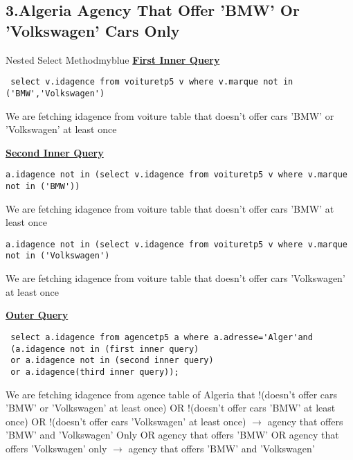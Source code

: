 \subsection*{3.Algeria Agency That Offer 'BMW' Or 'Volkswagen' Cars Only}


\begin{prettyBox}{Nested Select Method}{myblue}
\textbf{\underline{First Inner Query}}

\begin{lstlisting}
 select v.idagence from voituretp5 v where v.marque not in ('BMW','Volkswagen')
\end{lstlisting}
We are fetching idagence from voiture table that doesn't offer cars 'BMW' or 'Volkswagen' at least once
\vspace{0.25cm}

\textbf{\underline{Second Inner Query}}
\begin{lstlisting}
a.idagence not in (select v.idagence from voituretp5 v where v.marque not in ('BMW'))
\end{lstlisting}
We are fetching idagence from voiture table that doesn't offer cars 'BMW' at least once
\vspace{0.25cm}

\begin{lstlisting}
a.idagence not in (select v.idagence from voituretp5 v where v.marque not in ('Volkswagen')
\end{lstlisting}
We are fetching idagence from voiture table that doesn't offer cars 'Volkswagen' at least once
\vspace{0.25cm}

\textbf{\underline{Outer Query}}
\begin{lstlisting}
 select a.idagence from agencetp5 a where a.adresse='Alger'and 
 (a.idagence not in (first inner query) 
 or a.idagence not in (second inner query) 
 or a.idagence(third inner query));
\end{lstlisting}
We are fetching idagence from agence table of Algeria that
!(doesn't offer cars 'BMW' or 'Volkswagen' at least once) OR 
!(doesn't offer cars 'BMW' at least once) OR
!(doesn't offer cars 'Volkswagen' at least once)
\(\rightarrow\) agency that offers 'BMW' and 'Volkswagen' Only OR agency that offers 'BMW' OR agency that offers
'Volkswagen' only \(\rightarrow\) agency that offers 'BMW' and 'Volkswagen' 

\end{prettyBox}

